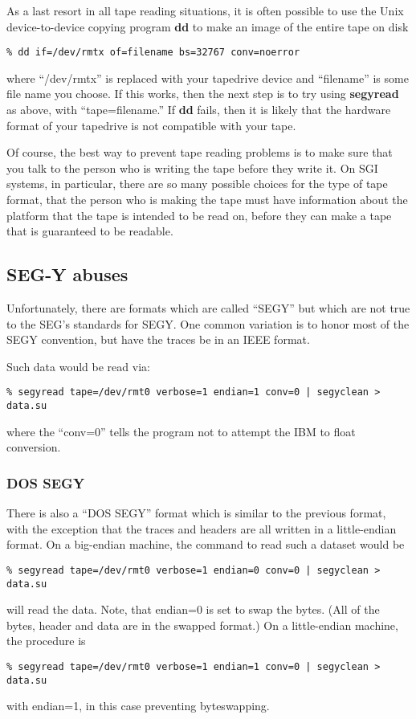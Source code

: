{{{As a last resort in all tape reading situations, it is often possible to
use the Unix device-to-device copying program {\bf dd\/} to make an image
of the entire tape on disk
{\small \begin{verbatim}
% dd if=/dev/rmtx of=filename bs=32767 conv=noerror
\end{verbatim}}\noindent
where ``/dev/rmtx'' is replaced with your tapedrive device and ``filename''
is some file name you choose.
If this works, then the next step is to try using {\bf segyread\/} as above,
with ``tape=filename.''
If {\bf dd\/} fails, then it is likely that the hardware format
of your tapedrive is not compatible with your tape.

Of course, the best way to prevent tape reading problems is to
make sure that you talk to the person who is writing the tape
before they write it. On SGI systems, in particular, there are
so many possible choices for the type of tape format, that the
person who is making the tape must have information about the platform
that the tape is intended to be read on, before they can make a
tape that is guaranteed to be readable.

\subsection{SEG-Y abuses}

Unfortunately, there are formats which are called ``SEGY'' but which
are not true to the SEG's standards for SEGY.
One common variation is to honor most of the SEGY convention, but
have the traces be in an IEEE format.

Such data would be read via:
{\small\begin{verbatim}
% segyread tape=/dev/rmt0 verbose=1 endian=1 conv=0 | segyclean > data.su
\end{verbatim}}\noindent
where the ``conv=0'' tells the program not to attempt the IBM to float
conversion.

\subsubsection{DOS SEGY}
There is also a ``DOS SEGY'' format which is similar to the previous
format, with the exception that the traces and headers are all written
in a little-endian format. On a big-endian machine,
the command to read such a dataset would be
{\small\begin{verbatim}
% segyread tape=/dev/rmt0 verbose=1 endian=0 conv=0 | segyclean > data.su
\end{verbatim}}\noindent
will read the data. Note, that endian=0 is set to swap the bytes.
(All of the bytes, header and data are in the swapped format.)
On a little-endian machine, the procedure is 
{\small\begin{verbatim}
% segyread tape=/dev/rmt0 verbose=1 endian=1 conv=0 | segyclean > data.su
\end{verbatim}}\noindent
with endian=1, in this case preventing byteswapping.

}}}
